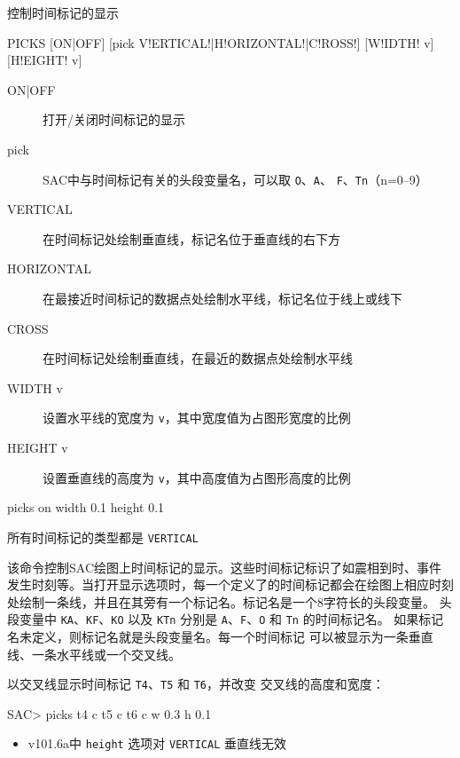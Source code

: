 \label{cmd:picks}

控制时间标记的显示

\begin{SACSTX}
PICKS [ON|OFF] [pick V!ERTICAL!|H!ORIZONTAL!|C!ROSS!] [W!IDTH! v] [H!EIGHT! v]
\end{SACSTX}

\begin{description}
\item [ON|OFF] 打开/关闭时间标记的显示
\item [pick] SAC中与时间标记有关的头段变量名，可以取 \texttt{O}、\texttt{A}、
    \texttt{F}、\texttt{Tn}（n=0--9）
\item [VERTICAL] 在时间标记处绘制垂直线，标记名位于垂直线的右下方
\item [HORIZONTAL] 在最接近时间标记的数据点处绘制水平线，标记名位于线上或线下
\item [CROSS] 在时间标记处绘制垂直线，在最近的数据点处绘制水平线
\item [WIDTH v] 设置水平线的宽度为 \texttt{v}，其中宽度值为占图形宽度的比例
\item [HEIGHT v] 设置垂直线的高度为 \texttt{v}，其中高度值为占图形高度的比例
\end{description}

\begin{SACDFT}
picks on width 0.1 height 0.1
\end{SACDFT}
所有时间标记的类型都是 \texttt{VERTICAL}

该命令控制SAC绘图上时间标记的显示。这些时间标记标识了如震相到时、事件
发生时刻等。当打开显示选项时，每一个定义了的时间标记都会在绘图上相应时刻
处绘制一条线，并且在其旁有一个标记名。标记名是一个8字符长的头段变量。
头段变量中 \texttt{KA}、\texttt{KF}、\texttt{KO} 以及 \texttt{KTn}
分别是 \texttt{A}、\texttt{F}、\texttt{O} 和 \texttt{Tn} 的时间标记名。
如果标记名未定义，则标记名就是头段变量名。每一个时间标记
可以被显示为一条垂直线、一条水平线或一个交叉线。

以交叉线显示时间标记 \texttt{T4}、\texttt{T5} 和 \texttt{T6}，并改变
交叉线的高度和宽度：
\begin{SACCode}
SAC> picks t4 c t5 c t6 c w 0.3 h 0.1
\end{SACCode}

\begin{itemize}
\item v101.6a中 \texttt{height} 选项对 \texttt{VERTICAL} 垂直线无效
\end{itemize}
